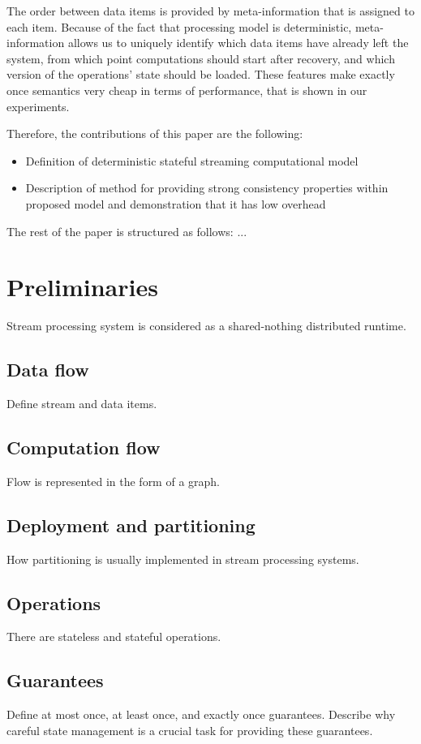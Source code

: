 \documentclass[sigconf]{acmart}
\theoremstyle{remark}
\begin{document}
The order between data items is provided by meta-information that is assigned to each item. Because of the fact that processing model is deterministic, meta-information allows us to uniquely identify which data items have already left the system, from which point computations should start after recovery, and which version of the operations' state should be loaded. These features make exactly once semantics very cheap in terms of performance, that is shown in our experiments.

Therefore, the contributions of this paper are the following:

\begin {itemize}
\item Definition of deterministic stateful streaming computational model 
\item Description of method for providing strong consistency properties within proposed model and demonstration that it has low overhead
\end {itemize}

The rest of the paper is structured as follows: ...

\section{Preliminaries}
Stream processing system is considered as
a shared-nothing distributed runtime.

\subsection{Data flow}
Define stream and data items.

\subsection{Computation flow}
Flow is represented in the form of a graph.

\subsection{Deployment and partitioning}
How partitioning is usually implemented in stream processing systems.

\subsection{Operations}
There are stateless and stateful operations.

\subsection{Guarantees}
Define at most once, at least once, and exactly once guarantees. Describe why careful state management is a crucial task for providing these guarantees.
\end{document}
